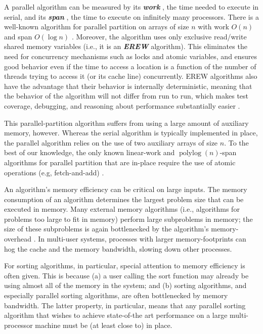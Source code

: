 \documentclass[11pt]{article}
\newcommand{\defn}[1]{{\textit{\textbf{\boldmath #1}}} }
\theoremstyle{remark}
\theoremstyle{remark}
\begin{document}
A parallel algorithm can be measured by its \defn{work}, the time
needed to execute in serial, and its \defn{span}, the time to execute
on infinitely many processors. There is a well-known algorithm for
parallel partition on arrays of size $n$ with work $O(n)$ and span
$O(\log n)$ \cite{Blelloch96,AcarBl16}. Moreover, the algorithm uses
only exclusive read/write shared memory variables (i.e., it is an
\defn{EREW} algorithm). This eliminates the need for concurrency
mechanisms such as locks and atomic variables, and ensures good
behavior even if the time to access a location is a function of the
number of threads trying to access it (or its cache line)
concurrently. EREW algorithms also have the advantage that their
behavior is internally deterministic, meaning that
the behavior of the algorithm will not differ from run to run, which
makes test coverage, debugging, and reasoning about performance
substantially easier \cite{BlellochFi12}.

This parallel-partition algorithm suffers from using a large amount of
auxiliary memory, however. Whereas the serial algorithm is typically
implemented in place, the parallel algorithm relies on the use of two
auxiliary arrays of size $n$. To the best of our knowledge, the only
known linear-work and $\operatorname{polylog}(n)$-span algorithms for
parallel partition that are in-place require the use of atomic
operations (e.g, fetch-and-add)
\cite{HeidelbergerNo90,AxtmannWi17,TsigasZh03}.

An algorithm's memory efficiency can be critical on large inputs. The
memory consumption of an algorithm determines the largest problem size
that can be executed in memory. Many external memory algorithms (i.e.,
algorithms for problems too large to fit in memory) perform large
subproblems in memory; the size of these subproblems is again
bottlenecked by the algorithm's memory-overhead \cite{Vitter08}. In
multi-user systems, processes with larger memory-footprints can hog
the cache and the memory bandwidth, slowing down other processes.

For sorting algorithms, in particular, special attention to memory
efficiency is often given. This is because (a) a user calling the sort
function may already be using almost all of the memory in the system;
and (b) sorting algorithms, and especially parallel sorting
algorithms, are often bottlenecked by memory bandwidth. The latter
property, in particular, means that any parallel sorting algorithm
that wishes to achieve state-of-the art performance on a large
multi-processor machine must be (at least close to) in place.
\end{document}
